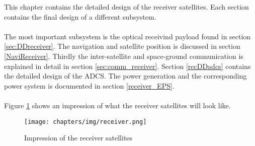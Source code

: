 This chapter contains the detailed design of the receiver satellites. Each section contains the final design of a different subsystem. 
\\\\
The most important subsystem is the optical receivind payload found in section \ref{sec:DDreceiver}. The navigation and satellite position is discussed in section \ref{NaviReceiver}. Thirdly the inter-satellite and space-ground communication is explained in detail in section \ref{sec:comm_receiver}. Section \ref{recDDadcs} contains the detailed design of the \ac{ADCS}. The power generation and the corresponding power system is documented in section \ref{receiver_EPS}. 
\\\\
Figure \ref{fig:receiverSat} shows an impression of what the receiver satellites will look like.

\begin{figure}[h!]
\centering
\texttt{[image: chapters/img/receiver.png]}
\caption{Impression of the receiver satellites}
\label{fig:receiverSat}
\end{figure}